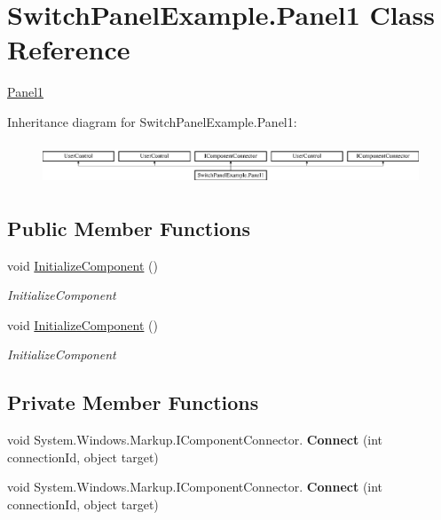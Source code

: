 \hypertarget{class_switch_panel_example_1_1_panel1}{}\section{Switch\+Panel\+Example.\+Panel1 Class Reference}
\label{class_switch_panel_example_1_1_panel1}


\mbox{\hyperlink{class_switch_panel_example_1_1_panel1}{Panel1}}  


Inheritance diagram for Switch\+Panel\+Example.\+Panel1\+:\begin{figure}[H]
\begin{center}
\leavevmode
\includegraphics[height=1.251397cm]{d2/d28/class_switch_panel_example_1_1_panel1}
\end{center}
\end{figure}
\subsection*{Public Member Functions}
\begin{DoxyCompactItemize}
\item 
void \mbox{\hyperlink{class_switch_panel_example_1_1_panel1_aaa732239a094df0172b10acf803dba09}{Initialize\+Component}} ()
\begin{DoxyCompactList}\small\item\em Initialize\+Component \end{DoxyCompactList}\item 
void \mbox{\hyperlink{class_switch_panel_example_1_1_panel1_aaa732239a094df0172b10acf803dba09}{Initialize\+Component}} ()
\begin{DoxyCompactList}\small\item\em Initialize\+Component \end{DoxyCompactList}\end{DoxyCompactItemize}
\subsection*{Private Member Functions}
\begin{DoxyCompactItemize}
\item 
\mbox{\label{class_switch_panel_example_1_1_panel1_a8caf08cf7f05ce630537a7cd80271983}} 
void System.\+Windows.\+Markup.\+I\+Component\+Connector. {\bfseries Connect} (int connection\+Id, object target)
\item 
\mbox{\label{class_switch_panel_example_1_1_panel1_a8caf08cf7f05ce630537a7cd80271983}} 
void System.\+Windows.\+Markup.\+I\+Component\+Connector. {\bfseries Connect} (int connection\+Id, object target)
\end{DoxyCompactItemize}
